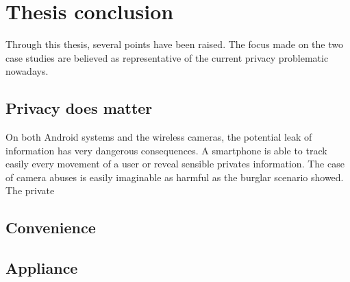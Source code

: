 \chapter{Thesis conclusion}

Through this thesis, several points have been raised.
The focus made on the two case studies are believed as representative of the current privacy problematic nowadays.

\section{Privacy does matter}

On both Android systems and the wireless cameras, the potential leak of information has very dangerous consequences.
A smartphone is able to track easily every movement of a user or reveal sensible privates information.
The case of camera abuses is easily imaginable as harmful as the burglar scenario showed.\\

The private 

\section{Convenience}


\section{Appliance}



